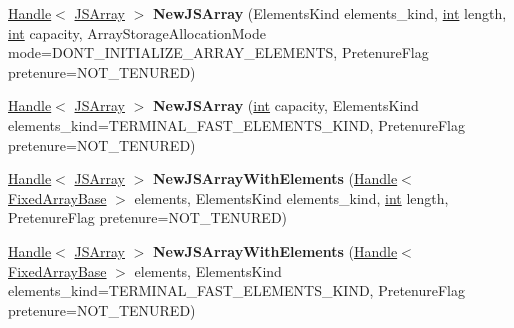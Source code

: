 \begin{DoxyCompactItemize}
\mbox{\hyperlink{classv8_1_1internal_1_1Handle}{Handle}}$<$ \mbox{\hyperlink{classv8_1_1internal_1_1JSArray}{J\+S\+Array}} $>$ {\bfseries New\+J\+S\+Array} (Elements\+Kind elements\+\_\+kind, \mbox{\hyperlink{classint}{int}} length, \mbox{\hyperlink{classint}{int}} capacity, Array\+Storage\+Allocation\+Mode mode=D\+O\+N\+T\+\_\+\+I\+N\+I\+T\+I\+A\+L\+I\+Z\+E\+\_\+\+A\+R\+R\+A\+Y\+\_\+\+E\+L\+E\+M\+E\+N\+TS, Pretenure\+Flag pretenure=N\+O\+T\+\_\+\+T\+E\+N\+U\+R\+ED)
\item 
\mbox{\label{classv8_1_1internal_1_1Factory_ab6b5f314dce0712ebbca5c5d86c40afe}} 
\mbox{\hyperlink{classv8_1_1internal_1_1Handle}{Handle}}$<$ \mbox{\hyperlink{classv8_1_1internal_1_1JSArray}{J\+S\+Array}} $>$ {\bfseries New\+J\+S\+Array} (\mbox{\hyperlink{classint}{int}} capacity, Elements\+Kind elements\+\_\+kind=T\+E\+R\+M\+I\+N\+A\+L\+\_\+\+F\+A\+S\+T\+\_\+\+E\+L\+E\+M\+E\+N\+T\+S\+\_\+\+K\+I\+ND, Pretenure\+Flag pretenure=N\+O\+T\+\_\+\+T\+E\+N\+U\+R\+ED)
\item 
\mbox{\label{classv8_1_1internal_1_1Factory_ac961cb471c4a711dbd719ff063a248a6}} 
\mbox{\hyperlink{classv8_1_1internal_1_1Handle}{Handle}}$<$ \mbox{\hyperlink{classv8_1_1internal_1_1JSArray}{J\+S\+Array}} $>$ {\bfseries New\+J\+S\+Array\+With\+Elements} (\mbox{\hyperlink{classv8_1_1internal_1_1Handle}{Handle}}$<$ \mbox{\hyperlink{classv8_1_1internal_1_1FixedArrayBase}{Fixed\+Array\+Base}} $>$ elements, Elements\+Kind elements\+\_\+kind, \mbox{\hyperlink{classint}{int}} length, Pretenure\+Flag pretenure=N\+O\+T\+\_\+\+T\+E\+N\+U\+R\+ED)
\item 
\mbox{\label{classv8_1_1internal_1_1Factory_a006438078a86371b7544beffd8520d8f}} 
\mbox{\hyperlink{classv8_1_1internal_1_1Handle}{Handle}}$<$ \mbox{\hyperlink{classv8_1_1internal_1_1JSArray}{J\+S\+Array}} $>$ {\bfseries New\+J\+S\+Array\+With\+Elements} (\mbox{\hyperlink{classv8_1_1internal_1_1Handle}{Handle}}$<$ \mbox{\hyperlink{classv8_1_1internal_1_1FixedArrayBase}{Fixed\+Array\+Base}} $>$ elements, Elements\+Kind elements\+\_\+kind=T\+E\+R\+M\+I\+N\+A\+L\+\_\+\+F\+A\+S\+T\+\_\+\+E\+L\+E\+M\+E\+N\+T\+S\+\_\+\+K\+I\+ND, Pretenure\+Flag pretenure=N\+O\+T\+\_\+\+T\+E\+N\+U\+R\+ED)
\item 
\mbox{\label{classv8_1_1internal_1_1Factory_a257b63d5e83e6547401061fca8f88821}} 

\end{DoxyCompactItemize}
